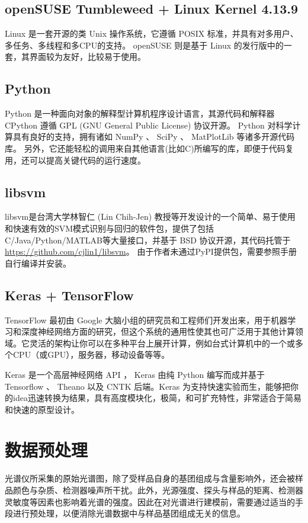 \documentclass[a4paper]{article}
\begin{document}
		\subsection{openSUSE Tumbleweed + Linux Kernel 4.13.9}
			Linux 是一套开源的类 Unix 操作系统，它遵循 POSIX 标准，并具有对多用户、多任务、多线程和多CPU的支持。 
			openSUSE 则是基于 Linux 的发行版中的一套，其界面较为友好，比较易于使用。
		\subsection{Python}
			Python 是一种面向对象的解释型计算机程序设计语言，其源代码和解释器 CPython 遵循 GPL (GNU General Public License) 协议开源。
			Python 对科学计算具有良好的支持，拥有诸如 NumPy 、 SciPy 、 MatPlotLib 等诸多开源代码库。
			另外，它还能轻松的调用来自其他语言(比如C)所编写的库，即便于代码复用，还可以提高关键代码的运行速度。
		\subsection{libsvm}
			libsvm是台湾大学林智仁 (Lin Chih-Jen) 教授等开发设计的一个简单、易于使用和快速有效的SVM模式识别与回归的软件包，提供了包括C/Java/Python/MATLAB等大量接口，并基于 BSD 协议开源，其代码托管于\url{https://github.com/cjlin1/libsvm}。
			由于作者未通过PyPI提供包，需要参照手册自行编译并安装。
		\subsection{Keras + TensorFlow}
			TensorFlow 最初由 Google 大脑小组的研究员和工程师们开发出来，用于机器学习和深度神经网络方面的研究，但这个系统的通用性使其也可广泛用于其他计算领域。它灵活的架构让你可以在多种平台上展开计算，例如台式计算机中的一个或多个CPU（或GPU），服务器，移动设备等等。
			
			Keras 是一个高层神经网络 API ， Keras 由纯 Python 编写而成并基于 Tensorflow 、 Theano 以及 CNTK 后端。Keras 为支持快速实验而生，能够把你的idea迅速转换为结果，具有高度模块化，极简，和可扩充特性，非常适合于简易和快速的原型设计。
			
	\section{数据预处理}
		光谱仪所采集的原始光谱图，除了受样品自身的基团组成与含量影响外，还会被样品颜色与杂质、检测器噪声所干扰。此外，光源强度、探头与样品的矩离、检测器灵敏度等因素也影响着光谱的强度。因此在对光谱进行建模前，需要通过适当的手段进行预处理，以便消除光谱数据中与样品基团组成无关的信息。
		
\end{document}
